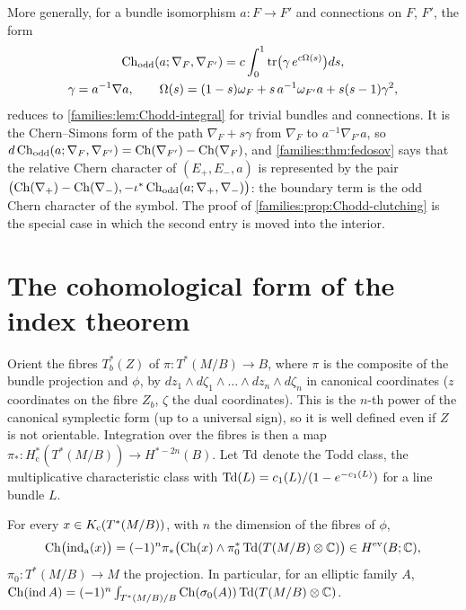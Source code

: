 \begin{remark}\label{families:rem:Chodd-fedosov}
  More generally, for a bundle isomorphism $a\colon F\to F'$ and connections on $F$, $F'$, the
  form
  \begin{gather*}
    \operatorname{Ch}_{\mathrm{odd}}(a;\nabla_F,\nabla_{F'})=c\int_0^1\operatorname{tr}\bigl(\gamma\,e^{c\Omega(s)}\bigr)ds,\\
    \gamma=a^{-1}\nabla a,\qquad\Omega(s)=(1-s)\omega_F+s\,a^{-1}\omega_{F'}a+s(s-1)\gamma^2,
  \end{gather*}
  reduces to \cref{families:lem:Chodd-integral} for trivial bundles and connections. It is
  the Chern--Simons form of the path $\nabla_F+s\gamma$ from $\nabla_F$ to $a^{-1}\nabla_{F'}a$, so
  $d\operatorname{Ch}_{\mathrm{odd}}(a;\nabla_F,\nabla_{F'})=\operatorname{Ch}(\nabla_{F'})-\operatorname{Ch}(\nabla_F)$, and
  \cref{families:thm:fedosov} says that the relative Chern character of $(E_+,E_-,a)$ is
  represented by the pair $\bigl(\operatorname{Ch}(\nabla_+)-\operatorname{Ch}(\nabla_-),-\iota^*\operatorname{Ch}_{\mathrm{odd}}(a;\nabla_+,\nabla_-)\bigr)$:
  the boundary term is the odd Chern character of the symbol. The proof of
  \cref{families:prop:Chodd-clutching} is the special case in which the second entry is moved
  into the interior.
\end{remark}

\section{The cohomological form of the index theorem}\label{families:sec:cohomology}

Orient the fibres $T^*_{b}(Z)$ of $\pi:T^*(M/B)\to B$, where $\pi$ is the
composite of the bundle projection and $\phi$, by
$dz_1\wedge d\zeta_1\wedge\dots\wedge dz_n\wedge d\zeta_n$ in canonical
coordinates ($z$ coordinates on the fibre $Z_b$, $\zeta$ the dual
coordinates). This is the $n$-th power of the canonical symplectic form (up to
a universal sign), so it is well defined even if $Z$ is not orientable.
Integration over the fibres is then a map
$\pi_*:H^*_{\mathrm c}(T^*(M/B))\to H^{*-2n}(B)$. Let $\operatorname{Td}$ denote the Todd
class, the multiplicative characteristic class with $\operatorname{Td}(L)=c_1(L)/(1-e^{-c_1(L)})$
for a line bundle $L$.

\begin{theorem}\label{families:thm:AS-H}
  For every $x\in K_{\mathrm{c}}(T^*(M/B))$, with $n$ the dimension of the fibres of $\phi$,
  \begin{equation*}
    \operatorname{Ch}\bigl(\operatorname{ind}_{\mathrm{a}}(x)\bigr)=(-1)^n\pi_*\bigl(\operatorname{Ch}(x)\wedge\pi_0^*\operatorname{Td}(T(M/B)
    \otimes\mathbb{C})\bigr)\in H^{\mathrm{ev}}(B;\mathbb{C}),
  \end{equation*}
  $\pi_0:T^*(M/B)\to M$ the projection. In particular, for an elliptic family
  $A$, $\operatorname{Ch}(\operatorname{ind} A)=(-1)^n\int_{T^*(M/B)/B}\operatorname{Ch}(\sigma_0(A))\operatorname{Td}(T(M/B)\otimes\mathbb{C})$.
\end{theorem}

